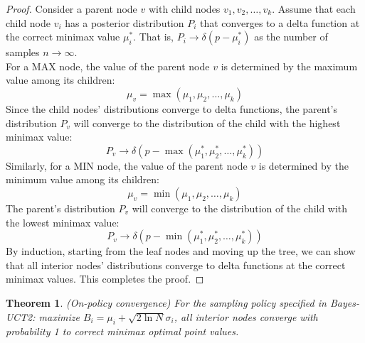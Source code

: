 \documentclass[11pt]{article}
\theoremstyle{definitionstyle}
\newtheorem{thm}{Theorem}
\newenvironment{framedminipage}
    {\begin{framed}\begin{minipage}{0.9\textwidth}}
    {\end{minipage}\end{framed}}
\begin{document}
\begin{proof} Consider a parent node \(v\) with child nodes \(v_1, v_2, \ldots, v_k\). Assume that each child node \(v_i\) has a posterior distribution \(P_i\) that converges to a delta function at the correct minimax value \(\mu_i^*\). That is, \(P_i \to \delta(p - \mu_i^*)\) as the number of samples \(n \to \infty\).\\
For a MAX node, the value of the parent node \(v\) is determined by the maximum value among its children:
\[
\mu_v = \max(\mu_1, \mu_2, \ldots, \mu_k)
\]
Since the child nodes' distributions converge to delta functions, the parent's distribution \(P_v\) will converge to the distribution of the child with the highest minimax value:
\[
P_v \to \delta(p - \max(\mu_1^*, \mu_2^*, \ldots, \mu_k^*))
\]
Similarly, for a MIN node, the value of the parent node \(v\) is determined by the minimum value among its children:
\[
\mu_v = \min(\mu_1, \mu_2, \ldots, \mu_k)
\]
The parent's distribution \(P_v\) will converge to the distribution of the child with the lowest minimax value:
\[
P_v \to \delta(p - \min(\mu_1^*, \mu_2^*, \ldots, \mu_k^*))
\]
By induction, starting from the leaf nodes and moving up the tree, we can show that all interior nodes' distributions converge to delta functions at the correct minimax values. This completes the proof.
\end{proof}
\begin{framedminipage}
\begin{thm} (On-policy convergence) For the sampling policy specified in Bayes-UCT2: maximize \(B_i = \mu_i + \sqrt{2 \ln N} \sigma_i\), all interior nodes converge with probability 1 to correct minimax optimal point values.
\end{thm}
\end{framedminipage}
\end{document}
